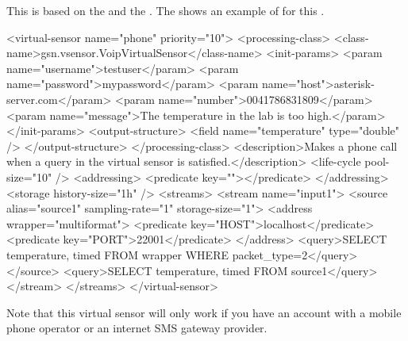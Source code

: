 This \vs is based on the  \vsp and the  \wrapper.
The  shows an example of \vsd for this \vs.

\begin{xmlcode}[caption={Sample of VoIP VSD file}, label=listing:xml:voip_vsd]
<virtual-sensor name="phone" priority="10">
	<processing-class>
	<class-name>gsn.vsensor.VoipVirtualSensor</class-name>
		<init-params>
			<param name="username">testuser</param>
			<param name="password">mypassword</param>
			<param name="host">asterisk-server.com</param>
			<param name="number">0041786831809</param>
			<param name="message">The temperature in the lab is too high.</param>
		</init-params>
		<output-structure>
			<field name="temperature" type="double" />
		</output-structure>
	</processing-class>
	<description>Makes a phone call when a query in the virtual sensor is satisfied.</description>
	<life-cycle pool-size="10" />
	<addressing>
		<predicate key=""></predicate>
	</addressing>
	<storage history-size="1h" />
  <streams>
    <stream name="input1">
    <source alias="source1" sampling-rate="1" storage-size="1">
      <address wrapper="multiformat">
          <predicate key="HOST">localhost</predicate>
          <predicate key="PORT">22001</predicate>
      </address>
      <query>SELECT temperature, timed FROM wrapper WHERE packet_type=2</query>
    </source>
    <query>SELECT temperature, timed FROM source1</query>
    </stream> 
  </streams>
</virtual-sensor>
\end{xmlcode}

Note that this virtual sensor will only work if you have an account with a mobile phone operator or an internet SMS gateway provider. 